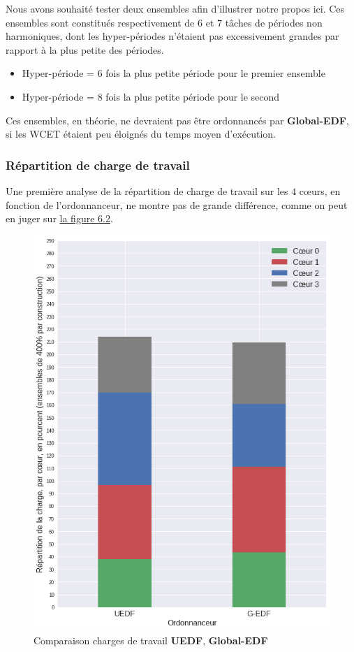 	Nous avons souhaité tester deux ensembles afin d'illustrer notre propos ici. Ces ensembles sont
	 constitués respectivement de $6$ et $7$ tâches de périodes 
	non harmoniques, dont les hyper-périodes n'étaient pas excessivement grandes par rapport à la plus petite des périodes.
	\begin{itemize}
		\item Hyper-période = $6$ fois la plus petite période pour le premier ensemble
		\item Hyper-période = $8$ fois la plus petite période pour le second
	\end{itemize}
	Ces ensembles, en théorie, ne devraient pas être ordonnancés par \textbf{Global-EDF}, si les WCET étaient peu éloignés du temps 
	moyen d'exécution.\newline
	
	
	\subsubsection{Répartition de charge de travail}
	Une première analyse de la répartition de charge de travail sur les $4$ cœurs, en fonction de l'ordonnanceur, 
	ne montre pas de grande différence, comme on peut en juger sur \hyperref[3tasksmigrations]{la figure 6.2}.
	
	\begin{figure}[H]
		\label{3tasksmigrations}
		\caption{Comparaison charges de travail \textbf{UEDF}, \textbf{Global-EDF}}
		\includegraphics[scale=0.6]{img/wcet/repartitiondecharges_migrations.png}
	\end{figure}
	
